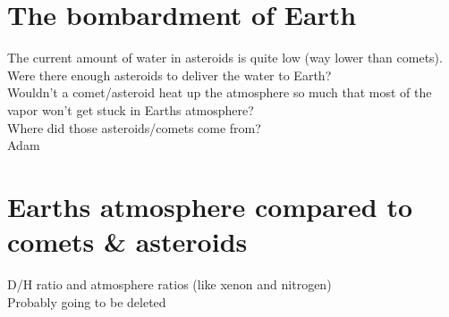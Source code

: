 \documentclass[11pt]{article}
\begin{document}
\section{The bombardment of Earth}
The current amount of water in asteroids is quite low (way lower than comets). Were there enough asteroids to deliver the water to Earth?\\
Wouldn't a comet/asteroid heat up the atmosphere so much that most of the vapor won't get stuck in Earths atmosphere?\\
Where did those asteroids/comets come from?\\
Adam


\section{Earths atmosphere compared to comets \& asteroids}
D/H ratio and atmosphere ratios (like xenon and nitrogen)\\
Probably going to be deleted


\newpage				%



\newpage				%



\newpage				%


\end{document}
